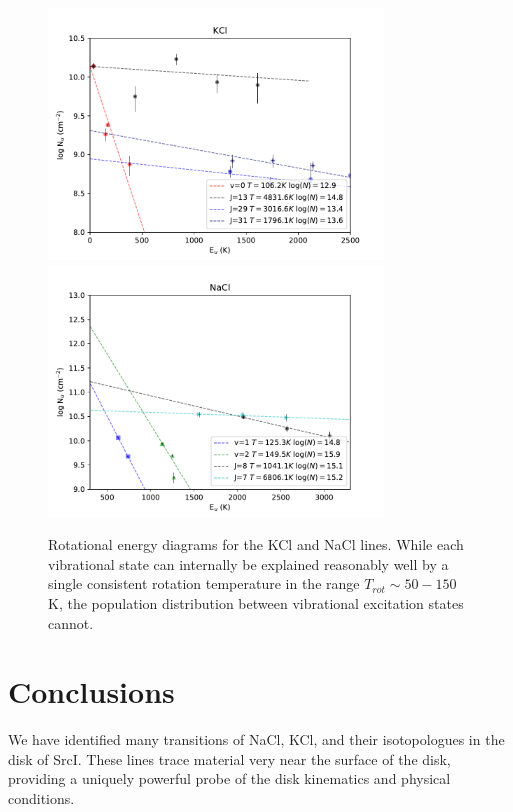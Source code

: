 \documentclass[twocolumn]{aastex62}
\newcommand{\sourcei}{SrcI\xspace}
\begin{document}
\begin{figure}[!htp]
\includegraphics[scale=1,width=3.5in]{figures/KCl_rotational_diagrams.pdf}
\includegraphics[scale=1,width=3.5in]{figures/NaCl_rotational_diagrams.pdf}
\caption{Rotational energy diagrams for the KCl and NaCl lines.  While each
vibrational state can internally be explained reasonably well by a single
consistent rotation temperature in the range $T_{rot}\sim50-150$ K, the population
distribution between vibrational excitation states cannot.}
\label{fig:rotationdiagrams}
\end{figure}









\section{Conclusions}
We have identified many transitions of NaCl, KCl, and their isotopologues in
the disk of \sourcei.  These lines trace material very near the surface of the
disk, providing a uniquely powerful probe of the disk kinematics and physical
conditions.
\end{document}
